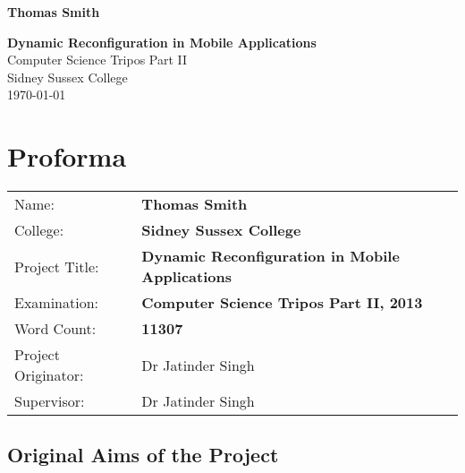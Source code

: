 \documentclass[12pt,twoside,notitlepage]{report}
\newcommand{\disstitle}{Dynamic Reconfiguration in Mobile Applications}
\newcommand{\wordcount}{11307}
\begin{document}





\pagestyle{empty}

\hfill{\LARGE \bf Thomas Smith}

\vspace*{60mm}
\begin{center}
\Huge
{\bf \disstitle} \\
\vspace*{5mm}
Computer Science Tripos Part II \\
\vspace*{5mm}
Sidney Sussex College \\
\vspace*{5mm}
\today  %
\end{center}

\cleardoublepage


\setcounter{page}{1}
\pagestyle{plain}

\chapter*{Proforma}

{\large
\begin{tabular}{l p{9.5cm}}
Name:               & \bf Thomas Smith	\\
College:            & \bf Sidney Sussex College	\\
Project Title:      & \bf \disstitle	\\
Examination:        & \bf Computer Science Tripos Part II, 2013 	\\
Word Count:         & \bf\wordcount\footnotemark[1] \\
Project Originator: & Dr Jatinder Singh		\\
Supervisor:         & Dr Jatinder Singh		\\ 
\end{tabular}
}



\section*{Original Aims of the Project}
\end{document}
